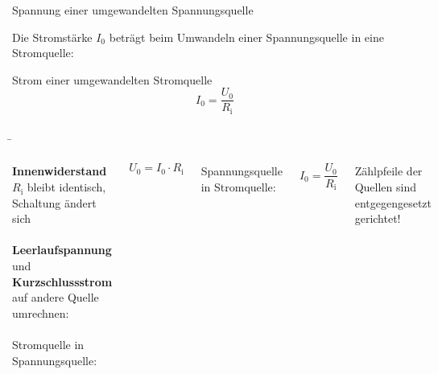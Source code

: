 \begin{frame}
{\begin{Merksatz}{Spannung einer umgewandelten Spannungsquelle}{}
		\end{Merksatz}

		Die Stromstärke $I_0$ beträgt beim Umwandeln einer Spannungsquelle in eine Stromquelle:

		\begin{Merksatz}{Strom einer umgewandelten Stromquelle}{}
			\begin{equation*}
				I_0 = \frac{U_0}{R_\mathrm{i}}
			\end{equation*}

		\end{Merksatz}

	}



	\b{


		\begin{columns}

			\textbf{Innenwiderstand} $R_\mathrm{i}$ bleibt identisch,\\
			Schaltung ändert sich\\

			\phantom{.}\\

			\textbf{Leerlaufspannung} und \textbf{Kurzschlussstrom} auf andere Quelle umrechnen:\\

			\phantom{text}\\

			Stromquelle in Spannungsquelle:

			\begin{equation*}
				U_0 = I_0 \cdot R_\mathrm{i}
			\end{equation*}

			Spannungsquelle in Stromquelle:

			\begin{equation*}
				I_0 = \frac{U_0}{R_\mathrm{i}}
			\end{equation*}

			Zählpfeile der Quellen sind entgegengesetzt gerichtet!




			\vspace*{-15pt}
\end{columns}}
\end{frame}
